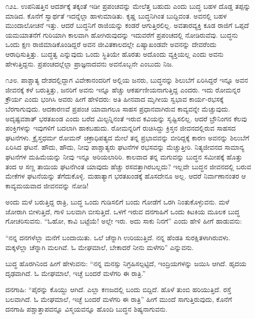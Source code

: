 ೧೨೭. ಉಪನಿಷತ್ತಿನ ಆದರ್ಶಕ್ಕೆ ತಕ್ಕಂತೆ ಇಡೀ ಪ್ರಪಂಚವನ್ನು ಮೇಲೆತ್ತ ಬಹುದು ಎಂದು ಬುದ್ಧ ಬಹಳ ದೊಡ್ಡ ತಪ್ಪನ್ನು ಮಾಡಿದ. ಕೊನೆಗೆ ಸ್ವಾರ್ಥತೆ ಇದನ್ನೆಲ್ಲಾ ಹಾಳುಮಾಡಿತು. ಕೃಷ್ಣ ಬುದ್ಧನಿಗಿಂತ ಬುದ್ದಿವಂತ. ಅವನಲ್ಲಿ ಬಹಳ ಮುಂದಾಲೋಚನೆ ಇತ್ತು. ಆದರೆ ಬುದ್ಧನಿಗೆ ರಾಜಿಯನ್ನು ಕಂಡರೆ ಆಗುತ್ತಿರಲಿಲ್ಲ. ಅವತಾರವ್ಯಕ್ತಿ ಕೂಡ ರಾಜಿಗೆ ಒಪ್ಪದೆ ಯಮಯಾತನೆಗೆ ಗುರಿಯಾಗಿ ಕಾಲವಾಗಿ ಹೋಗಿರುವುದನ್ನು ಇದುವರೆಗೆ ಪ್ರಪಂಚದಲ್ಲಿ ನೋಡಿರುವೆವು. ಬುದ್ಧನು ಒಂದು ಕ್ಷಣ ರಾಜಿಮಾಡಿಕೊಂಡಿದ್ದರೆ ಅವನ ಜೀವಿತಕಾಲದಲ್ಲೇ ಏಷ್ಯಾಖಂಡವೇ ಅವನನ್ನು ದೇವರೆಂದು ಆರಾಧಿಸುತ್ತಿತ್ತು. ಬುದ್ಧತ್ವ ಎನ್ನುವುದು ಒಂದು ಸ್ಥಿತಿಯೇ ಹೊರತು ಅದೊಂದು ವ್ಯಕ್ತಿಯಲ್ಲ ಎಂದು ಅವನು ಹೇಳುತ್ತಿದ್ದನು. ಪ್ರಪಂಚದಲ್ಲೆಲ್ಲಾ ಪ್ರಾಜ್ಞನಾದವನು ಅವನೊಬ್ಬನೇ ಎಂಬುದು ನಿಜ.

೧೨೮. ಪಾಶ್ಚಾತ್ಯ ದೇಶದಲ್ಲಿದ್ದಾಗ ವಿವೇಕಾನಂದರಿಗೆ ಅಲ್ಲಿಯ ಜನರು, ಬುದ್ಧನನ್ನು ಶಿಲುಬೆಗೆ ಏರಿಸಿದ್ದರೆ ಇನ್ನೂ ಅವನ ಜೀವನಕ್ಕೆ ಕಳೆ ಬರುತ್ತಿತ್ತು, ಜನರಿಗೆ ಅವನು ಇನ್ನೂ ಹೆಚ್ಚು ಆಕರ್ಷಣೀಯನಾಗುತ್ತಿದ್ದ ಎಂದರು. ಇದು ರೋಮನ್ನರ ಕ್ರೌರ್ಯ ಎಂದು ಭಂಗಿಸಿ ಅವರು ಹೀಗೆ ಹೇಳಿದರು: ಅತಿ ಹೀನವಾದ ಮೃಗೀಯ ಸ್ವಭಾವ ಕಾರ್ಯ-ರಭಸಕ್ಕೆ ಬೆರಗಾಗುವುದು. ಆದಕಾರಣವೆ ಪ್ರಪಂಚ ಯಾವಾಗಲೂ ಸಾಹಸ ಪ್ರಧಾನವಾಗಿರುವ ಕಾವ್ಯವನ್ನೇ ಮೆಚ್ಚುವುದು. ಅದೃಷ್ಟವಶಾತ್ ಭರತಖಂಡ  ಎಂದು ಬರೆದ ಮಿಲ್ಟನ್ನಿನಂತೆ ಇರುವ ಕವಿಯನ್ನು ಸೃಷ್ಟಿಸಲಿಲ್ಲ. ಆದರೆ ಬ್ರೌನಿಂಗನ ಕೆಲವು ಪಂಕ್ತಿಗಳನ್ನು ಇವುಗಳಿಗೆ ಬದಲಾಗಿ ಹಾಕಬಹುದು. ರೋಮನ್ನರಿಗೆ ರುಚಿಸಿದ್ದು ಕ್ರಿಸ್ತನ ಜೀವನದಲ್ಲಿರುವ ಸಾಹಸದ ಘಟನೆಗಳು. ಕ್ರೈಸ್ತಧರ್ಮ ರೋಮನ್ ಚಕ್ರಾಧಿಪತ್ಯದ ಮೇಲೆ ತನ್ನ ಪ್ರಭಾವವನ್ನು ಬೀರಿದ್ದಕ್ಕೆ ಕಾರಣ ಅವನನ್ನು ಶಿಲುಬೆಗೆ ಏರಿಸಿದ ಘಟನೆ. ಹೌದು, ಹೌದು, ನೀವು ಪಾಶ್ಚಾತ್ಯರು ಘಟನೆಗಳ ರಭಸವನ್ನು ಮೆಚ್ಚುತ್ತೀರಿ. ನಿತ್ಯಜೀವನದ ಸಾಮಾನ್ಯ ಘಟನೆಗಳ ಮಹಿಮೆಯನ್ನು ನೀವು ಇನ್ನೂ ಅರಿಯಲಾರಿರಿ. ಕಾಲವಾದ ತನ್ನ ಮಗುವನ್ನು ಬುದ್ಧನ ಸಮೀಪಕ್ಕೆ ಹೊತ್ತು ತಂದ ಆ ಸಣ್ಣ ತಾಯಿಯ ಘಟನೆಗಿಂತ ಯಾವುದು ಹೆಚ್ಚು ರಸವತ್ತಾಗಿರಬಲ್ಲದು? ಇಲ್ಲವೇ ಬುದ್ಧನ ಜೀವನದಲ್ಲಿ ಬರುವ ಮೇಕೆಗಳ ಘಟನೆಯನ್ನು ತೆಗೆದುಕೊಳ್ಳಿ. ಮಹಾತ್ಯಾಗ ಭರತಖಂಡಕ್ಕೆ ಹೊಸದೇನೂ ಅಲ್ಲ. ಆದರೆ ನಿರ್ವಾಣಾನಂತರ ಆ ಕಾವ್ಯಮಯವಾದ ಜೀವನವನ್ನು ನೋಡಿ!

ಅಂದು ಮಳೆ ಬರುತ್ತಿದ್ದ ರಾತ್ರಿ, ಬುದ್ಧ ಒಂದು ಗುಡಿಸಲಿಗೆ ಬಂದು ಗೋಡೆಗೆ ಒರಗಿ ನಿಂತುಕೊಳ್ಳುವನು. ಮಳೆ ಜೋರಾಗಿ ಬೀಳುತ್ತಿದೆ, ಗಾಳಿ ಬಲವಾಗಿ ಬೀಸುತ್ತಿದೆ. ಒಳಗೆ ಇರುವ ದನಗಾಹಿಗೆ ಒಂದು ಕಿಟಕಿಯ ಮೂಲಕ ಬುದ್ಧ ಗೋಚರಿಸುವನು. “ಓಹೋ, ಕಾವಿ ಬಟ್ಟೆಯೆ! ಅಲ್ಲೇ ಇರು. ಅದು ಸಾಕು ನಿನಗೆ” ಎಂದು ಹೇಳಿ ಹೀಗೆ ಹಾಡುವನು:

“ನನ್ನ ದನಗಳೆಲ್ಲಾ ಮನೆಗೆ ಬಂದಾಯಿತು. ಒಲೆ ಚೆನ್ನಾಗಿ ಉರಿಯುತ್ತಿದೆ. ನನ್ನ ಹೆಂಡತಿ ಸುರಕ್ಷಿತಳಾಗಿರುವಳು. ಮಕ್ಕಳೆಲ್ಲಾ ಚೆನ್ನಾಗಿ ಮಲಗಿವೆ. ಓ ಮೇಘಮಾಲೆ, ಬೇಕಾದರೆ ನೀನು ಮಳೆಗರಿ” ಎನ್ನುವನು.

ಬುದ್ಧ ಹೊರಗಿನಿಂದ ಹೀಗೆ ಹೇಳುವನು: “ನನ್ನ ಮನಸ್ಸು ನಿಗ್ರಹಿಸಲ್ಪಟ್ಟಿದೆ, ಇಂದ್ರಿಯಗಳನ್ನು ಜಯಿಸಿ ಆಗಿದೆ. ಹೃದಯ ದೃಢವಾಗಿದೆ. ಓ ಮೇಘಮಾಲೆ, ಇಚ್ಛೆ ಬಂದರೆ ಮಳೆಗರಿ ಈ ರಾತ್ರಿ.”

ದನಗಾಹಿ: “ಪೈರನ್ನು ಕೊಯ್ದು ಆಗಿದೆ. ಎಲ್ಲಾ ಕಣಜದಲ್ಲಿ ಬಂದು ಬಿದ್ದಿದೆ. ಹೊಳೆ ತುಂಬಿ ಹರಿಯುತ್ತಿದೆ. ರಸ್ತೆ ಬಲವಾಗಿದೆ. ಓ ಮೇಘಮಾಲೆ, ಇಚ್ಛೆ ಬಂದರೆ ಮಳೆಗರಿ ಈ ರಾತ್ರಿ” ಹೀಗೆ ಮುಂದೆ ಸಾಗುತ್ತಿರುವುದು, ಕೊನೆಗೆ ದನಗಾಹಿ ಪಶ್ಚಾತ್ತಾಪವನ್ನೂ ವಿಸ್ಮಯವನ್ನೂ ಹೊಂದಿ ಬುದ್ಧನ ಶಿಷ್ಯನಾಗುವನು.

